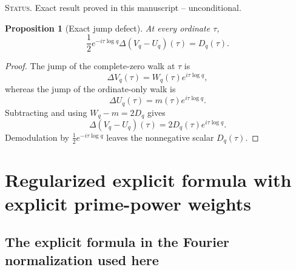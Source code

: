 \documentclass[11pt]{amsart}
\numberwithin{equation}{section}
\theoremstyle{plain}
\newtheorem{proposition}[theorem]{Proposition}
\theoremstyle{definition}
\theoremstyle{remark}
\newcommand{\1}{\mathbf{1}}
\newcommand{\statusnote}[1]{%
  \par\smallskip\noindent
  \begingroup\footnotesize\textsc{Status.} #1\endgroup
  \par\smallskip}
\begin{document}
\statusnote{Exact result proved in this manuscript -- unconditional.}
\begin{proposition}[Exact jump defect]
\label{prop:jump_defect}
At every ordinate $\tau$,
\begin{equation}
\boxed{
\frac12e^{-i\tau\log q}
\Delta(V_q-U_q)(\tau)
=
D_q(\tau).
}
\label{eq:jump_defect}
\end{equation}
\end{proposition}

\begin{proof}
The jump of the complete-zero walk at \(\tau\) is
\begin{equation}
\Delta V_q(\tau)
=
W_q(\tau)e^{i\tau\log q},
\label{eq:jump_complete_walk}
\end{equation}
whereas the jump of the ordinate-only walk is
\begin{equation}
\Delta U_q(\tau)
=
m(\tau)e^{i\tau\log q}.
\label{eq:jump_ordinate_walk}
\end{equation}
Subtracting and using \(W_q-m=2D_q\) gives
\begin{equation}
\Delta(V_q-U_q)(\tau)
=
2D_q(\tau)e^{i\tau\log q}.
\label{eq:jump_difference_detailed}
\end{equation}
Demodulation by \(\frac12e^{-i\tau\log q}\) leaves the nonnegative scalar
\(D_q(\tau)\).
\end{proof}

\section{Regularized explicit formula with explicit prime-power weights}
\label{sec:regularized_explicit_formula_detailed}

\subsection{The explicit formula in the Fourier normalization used here}
\label{subsec:guinand_weil_normalization}
\end{document}
